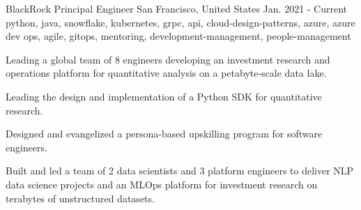 \cventry
    {BlackRock} %
    {Principal Engineer} %
    {San Francisco, United States} %
    {Jan. 2021 - Current} %
    { python, java, snowflake, kubernetes, grpc, api, cloud-design-patterns, azure, azure dev ops, agile, gitops, mentoring, development-management, people-management} %
    {
    \begin{cvitems} %
       \item {Leading a global team of 8 engineers developing an investment research and operations platform for quantitative analysis on a petabyte-scale data lake. }
       \item {Leading the design and implementation of a Python SDK for quantitative research. }
       \item {Designed and evangelized a persona-based upskilling program for software engineers. }
       \item {Built and led a team of 2 data scientists and 3 platform engineers to deliver NLP data science projects and an MLOps platform for investment research on terabytes of unstructured datasets. }
    \end{cvitems}
    }

